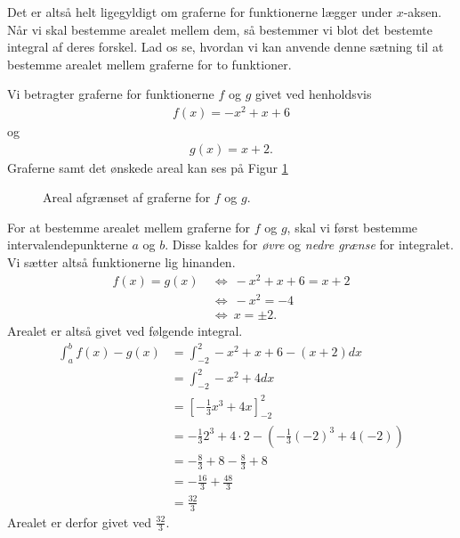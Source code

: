 \documentclass[12pt]{article}
\begin{document}
Det er altså helt ligegyldigt om graferne for funktionerne lægger under $x$-aksen. Når vi skal bestemme arealet mellem dem, så bestemmer vi blot det bestemte integral af deres forskel. Lad os se, hvordan vi kan anvende denne sætning til at bestemme arealet mellem graferne for to funktioner. 
\begin{exa}
	Vi betragter graferne for funktionerne $f$ og $g$ givet ved henholdsvis
	\begin{align*}
		f(x) = -x^2 + x + 6
	\end{align*}
	 og 
	 \begin{align*}
	 	g(x) = x + 2.
	 \end{align*}
	 Graferne samt det ønskede areal kan ses på Figur \ref{fig:exa}
	 \begin{figure}[H]
	\centering
		\caption{Areal afgrænset af graferne for $f$ og $g$.}
		\label{fig:exa}
	\end{figure}
	For at bestemme arealet mellem graferne for $f$ og $g$, skal vi først bestemme intervalendepunkterne $a$ og $b$. 
	Disse kaldes for \textit{øvre} og \textit{nedre grænse} for integralet. Vi sætter altså funktionerne lig hinanden.
	\begin{align*}
		f(x) = g(x) \ &\Leftrightarrow \ -x^2 + x + 6 = x + 2 \\
		&\Leftrightarrow \ -x^2 = -4 \\
		&\Leftrightarrow \ x = \pm 2.
	\end{align*}
	Arealet er altså givet ved følgende integral.
	\begin{align*}
		\int_{a}^bf(x) - g(x) &= \int_{-2}^2 -x^2 + x + 6 -(x + 2) dx \\
		&= \int_{-2}^2 -x^2 +4 dx \\
		&= \left[-\frac{1}{3}x^3 + 4x\right]_{-2}^2 \\
		&= -\frac{1}{3}2^3 + 4\cdot 2 - \left(-\frac{1}{3}(-2)^3 + 4(-2)\right)\\
		&= -\frac{8}{3} + 8 - \frac{8}{3} + 8 \\
		&= -\frac{16}{3} + \frac{48}{3} \\
		&= \frac{32}{3} 
	\end{align*}
	Arealet er derfor givet ved $\frac{32}{3}$.
\end{exa}
\end{document}
